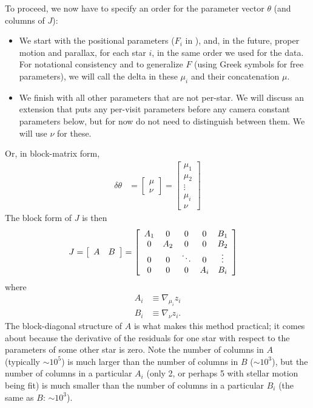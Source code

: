 To proceed, we now have to specify an order for the parameter vector $\theta$ (and columns of $J$):
\begin{itemize}
    \item We start with the positional parameters ($F_i$ in ), and, in the future, proper motion and parallax, for each star $i$, in the same order we used for the data.
    For notational consistency and to generalize $F$ (using Greek symbols for free parameters), we will call the delta in these $\mu_i$ and their concatenation $\mu$.
    \item We finish with all other parameters that are not per-star.
    We will discuss an extension that puts any per-visit parameters before any camera constant parameters below, but for now do not need to distinguish between them.
    We will use $\nu$ for these.
\end{itemize}
Or, in block-matrix form,
\begin{align}
    \delta\theta &= \left[
        \begin{array}{ c }
            \mu \\
            \nu
        \end{array}
    \right]
    =
    \left[
        \begin{array}{ c }
            \mu_1 \\
            \mu_2 \\
            \vdots \\
            \mu_i \\
            \nu
        \end{array}
    \right]
\end{align}
The block form of $J$ is then
\begin{align}
    J &= \left[
        \begin{array}{ c c }
            A & B
        \end{array}
    \right]
    = \left[
        \begin{array}{ c c c c c }
            A_1 & 0 & 0 & 0 & B_1 \\
            0 & A_2 & 0 & 0 & B_2 \\
            0 & 0 & \ddots & 0 & \vdots \\
            0 & 0 & 0 & A_i & B_i
        \end{array}
    \right]
\end{align}
where
\begin{align}
    A_i &\equiv \nabla_{\mu_i} z_i \\
    B_i &\equiv \nabla_{\nu} z_i.
\end{align}
The block-diagonal structure of $A$ is what makes this method practical; it comes about because the derivative of the residuals for one star with respect to the parameters of some other star is zero.
Note the number of columns in $A$ (typically $\sim 10^5$) is much larger than the number of columns in $B$ ($\sim 10^3$), but the number of columns in a particular $A_i$ (only 2, or perhaps 5 with stellar motion being fit) is much smaller than the number of columns in a particular $B_i$ (the same as $B$: $\sim 10^3$).

